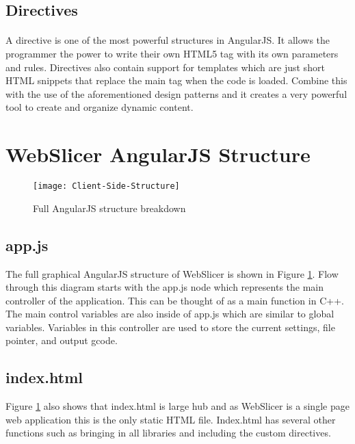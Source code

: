\subsection{Directives}
\paragraph{}
A directive is one of the most powerful structures in AngularJS.
It allows the programmer the power to write their own HTML5 tag with its own parameters and rules.
Directives also contain support for templates which are just short HTML snippets that replace the main tag when the code is loaded.
Combine this with the use of the aforementioned design patterns and it creates a very powerful tool to create and organize dynamic content.

\section{WebSlicer AngularJS Structure}
\begin{figure}[!ht]
  \centering
  \texttt{[image: Client-Side-Structure]}
  \caption{Full AngularJS structure breakdown}
  \label{fig:client-side-structure}
\end{figure}

\subsection{app.js}%
The full graphical AngularJS structure of WebSlicer is shown in Figure \ref{fig:client-side-structure}.
Flow through this diagram starts with the app.js node which represents the main controller of the application.
This can be thought of as a main function in C++.
The main control variables are also inside of app.js which are similar to global variables.
Variables in this controller are used to store the current settings, file pointer, and output gcode.

\subsection{index.html}%
Figure \ref{fig:client-side-structure} also shows that index.html is large hub and as WebSlicer is a single page web application this is the only static HTML file.
Index.html has several other functions such as bringing in all libraries and including the custom directives.

